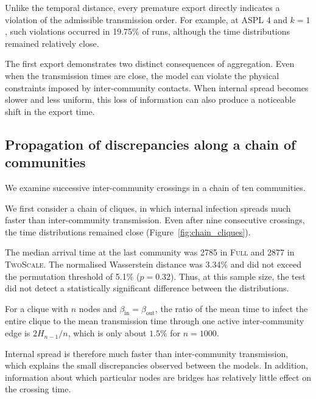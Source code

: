 \documentclass[a4paper,fleqn]{cas-sc}
\newcommand{\Full}{\textup{\textsc{Full}}}
\newcommand{\TS}{\textup{\textsc{TwoScale}}}
\begin{document}
Unlike the temporal distance, every premature export directly indicates a violation of the admissible transmission order. For example, at ASPL 4 and $k=1$, such violations occurred in 19.75\% of runs, although the time distributions remained relatively close.

The first export demonstrates two distinct consequences of aggregation. Even when the transmission times are close, the model can violate the physical constraints imposed by inter-community contacts. When internal spread becomes slower and less uniform, this loss of information can also produce a noticeable shift in the export time.


\subsection{Propagation of discrepancies along a chain of communities}
\label{sec:res_chain_random}

We examine successive inter-community crossings in a chain of ten communities.

We first consider a chain of cliques, in which internal infection spreads much faster than inter-community transmission. Even after nine consecutive crossings, the time distributions remained close (Figure~\ref{fig:chain_cliques}).

The median arrival time at the last community was 2785 in \Full{} and 2877 in \TS{}. The normalised Wasserstein distance was 3.34\% and did not exceed the permutation threshold of 5.1\% ($p=0.32$). Thus, at this sample size, the test did not detect a statistically significant difference between the distributions.

For a clique with $n$ nodes and $\beta_{\mathrm{in}}=\beta_{\mathrm{out}}$, the ratio of the mean time to infect the entire clique to the mean transmission time through one active inter-community edge is $2H_{n-1}/n$, which is only about $1.5\%$ for $n=1000$.

Internal spread is therefore much faster than inter-community transmission, which explains the small discrepancies observed between the models. In addition, information about which particular nodes are bridges has relatively little effect on the crossing time.
\end{document}
